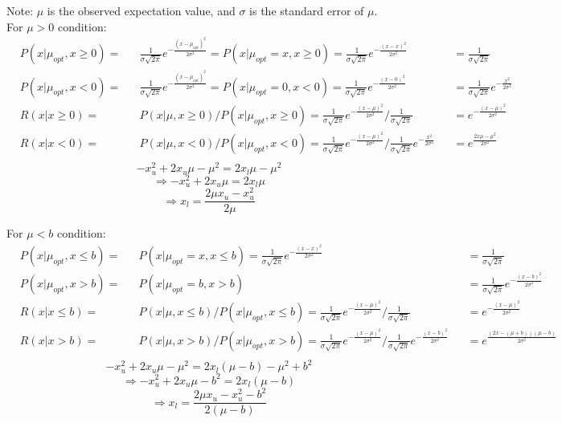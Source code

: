\documentclass{article}
\begin{document}
Note: $\mu$ is the observed expectation value, and $\sigma$ is the standard error of $\mu$.\\
For $\mu > 0$ condition:
\[
\begin{aligned}
	&P(x|\mu_{opt}, x \ge 0) = &&\frac{1}{\sigma\sqrt{2\pi}}e^{-\frac{(x-\mu_{opt})^2}{2\sigma^2}} = P(x|\mu_{opt} = x, x \ge 0) = \frac{1}{\sigma\sqrt{2\pi}}e^{-\frac{(x-x)^2}{2\sigma^2}}&& = \frac{1}{\sigma\sqrt{2\pi}}\\
	&P(x|\mu_{opt}, x < 0) = &&\frac{1}{\sigma\sqrt{2\pi}}e^{-\frac{(x-\mu_{opt})^2}{2\sigma^2}} = P(x|\mu_{opt} = 0, x < 0) = \frac{1}{\sigma\sqrt{2\pi}}e^{-\frac{(x-0)^2}{2\sigma^2}}&& = \frac{1}{\sigma\sqrt{2\pi}}e^{-\frac{x^2}{2\sigma^2}}\\
	&R(x|x \ge 0) =  &&P(x|\mu, x \ge 0)/P(x|\mu_{opt}, x \ge 0) =  \frac{1}{\sigma\sqrt{2\pi}}e^{-\frac{(x-\mu)^2}{2\sigma^2}}/\frac{1}{\sigma\sqrt{2\pi}}&& = e^{-\frac{(x-\mu)^2}{2\sigma^2}}\\
	&R(x|x < 0) =  &&P(x|\mu, x < 0)/P(x|\mu_{opt}, x < 0) =  \frac{1}{\sigma\sqrt{2\pi}}e^{-\frac{(x-\mu)^2}{2\sigma^2}}/\frac{1}{\sigma\sqrt{2\pi}}e^{-\frac{x^2}{2\sigma^2}}&& = e^{\frac{2x\mu - \mu^2}{2\sigma^2}}\\
\end{aligned}
\]
\[
	-x_u^2 + 2x_u\mu - \mu^2 = 2x_l\mu - \mu^2
\]
\[
	\Rightarrow -x_u^2 + 2x_u\mu  = 2x_l\mu
\]
\[
	\Rightarrow x_l = \frac{2\mu x_u - x_u^2}{2\mu}
\]

For $\mu < b$ condition:
\[
\begin{aligned}
	&P(x|\mu_{opt}, x \le b) = &&P(x|\mu_{opt} = x, x \le b) = \frac{1}{\sigma\sqrt{2\pi}}e^{-\frac{(x-x)^2}{2\sigma^2}}&& = \frac{1}{\sigma\sqrt{2\pi}}\\
	&P(x|\mu_{opt}, x > b) = &&P(x|\mu_{opt} = b, x > b)&& = \frac{1}{\sigma\sqrt{2\pi}}e^{-\frac{(x-b)^2}{2\sigma^2}}\\
	&R(x|x \le b) =  &&P(x|\mu, x \le b)/P(x|\mu_{opt}, x \le b) =  \frac{1}{\sigma\sqrt{2\pi}}e^{-\frac{(x-\mu)^2}{2\sigma^2}}/\frac{1}{\sigma\sqrt{2\pi}}&& = e^{-\frac{(x-\mu)^2}{2\sigma^2}}\\
	&R(x|x > b) =  &&P(x|\mu, x > b)/P(x|\mu_{opt}, x > b) =  \frac{1}{\sigma\sqrt{2\pi}}e^{-\frac{(x-\mu)^2}{2\sigma^2}}/\frac{1}{\sigma\sqrt{2\pi}}e^{-\frac{(x-b)^2}{2\sigma^2}}&& = e^{\frac{(2x-(\mu+b))(\mu-b)}{2\sigma^2}}\\
\end{aligned}
\]
\[
	-x_u^2 + 2x_u\mu - \mu^2 = 2x_l(\mu-b) - \mu^2 + b^2
\]
\[
	\Rightarrow -x_u^2 + 2x_u\mu -b^2 = 2x_l(\mu-b)
\]
\[
	\Rightarrow x_l = \frac{2\mu x_u - x_u^2 - b^2}{2(\mu-b)}
\]

 
\end{document}
